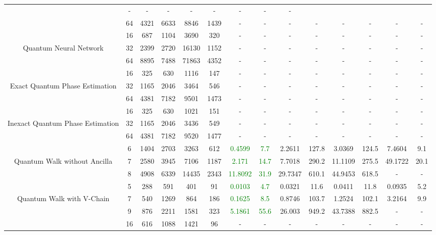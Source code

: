 \begin{table}[htb]
{\begin{tabular}{|c|c|c|c|c|c|c|c|c|c|c|c|c|c|}
 & - & -
 & - & -
 & - & -
 & - & -
 \\
 & 
64 & 4321 & 6633 & 8846 & 1439
 & - & -
 & - & -
 & - & -
 & - & -
 \\
\hline
 & 
16 & 687 & 1104 & 3690 & 320
 & - & -
 & - & -
 & - & -
 & - & -
 \\
Quantum Neural Network & 
32 & 2399 & 2720 & 16130 & 1152
 & - & -
 & - & -
 & - & -
 & - & -
 \\
 & 
64 & 8895 & 7488 & 71863 & 4352
 & - & -
 & - & -
 & - & -
 & - & -
 \\
\hline
 & 
16 & 325 & 630 & 1116 & 147
 & - & -
 & - & -
 & - & -
 & - & -
 \\
Exact Quantum Phase Estimation & 
32 & 1165 & 2046 & 3464 & 546
 & - & -
 & - & -
 & - & -
 & - & -
 \\
 & 
64 & 4381 & 7182 & 9501 & 1473
 & - & -
 & - & -
 & - & -
 & - & -
 \\
\hline
 & 
16 & 325 & 630 & 1021 & 151
 & - & -
 & - & -
 & - & -
 & - & -
 \\
Inexact Quantum Phase Estimation & 
32 & 1165 & 2046 & 3436 & 549
 & - & -
 & - & -
 & - & -
 & - & -
 \\
 & 
64 & 4381 & 7182 & 9520 & 1477
 & - & -
 & - & -
 & - & -
 & - & -
 \\
\hline
 & 
6 & 1404 & 2703 & 3263 & 612
 & \textcolor{green}{0.4599} & \textcolor{green}{7.7}
 & 2.2611 & 127.8
 & 3.0369 & 124.5
 & 7.4604 & 9.1
 \\
Quantum Walk without Ancilla & 
7 & 2580 & 3945 & 7106 & 1187
 & \textcolor{green}{2.171} & \textcolor{green}{14.7}
 & 7.7018 & 290.2
 & 11.1109 & 275.5
 & 49.1722 & 20.1
 \\
 & 
8 & 4908 & 6339 & 14435 & 2343
 & \textcolor{green}{11.8092} & \textcolor{green}{31.9}
 & 29.7347 & 610.1
 & 44.9453 & 618.5
 & - & -
 \\
\hline
 & 
5 & 288 & 591 & 401 & 91
 & \textcolor{green}{0.0103} & \textcolor{green}{4.7}
 & 0.0321 & 11.6
 & 0.0411 & 11.8
 & 0.0935 & 5.2
 \\
Quantum Walk with V-Chain & 
7 & 540 & 1269 & 864 & 186
 & \textcolor{green}{0.1625} & \textcolor{green}{8.5}
 & 0.8746 & 103.7
 & 1.2524 & 102.1
 & 3.2164 & 9.9
 \\
 & 
9 & 876 & 2211 & 1581 & 323
 & \textcolor{green}{5.1861} & \textcolor{green}{55.6}
 & 26.003 & 949.2
 & 43.7388 & 882.5
 & - & -
 \\
\hline
 & 
16 & 616 & 1088 & 1421 & 96
 & - & -
 & - & -
 & - & -
 & - & -
 \\

\end{tabular}}
\end{table}

